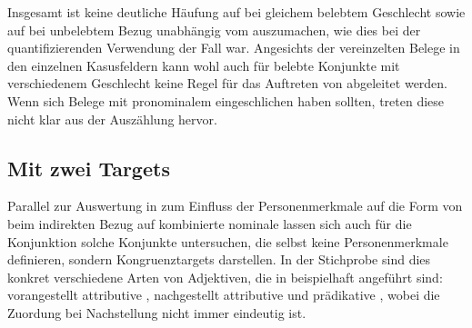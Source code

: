 Insgesamt ist keine deutliche Häufung auf  bei gleichem
belebtem Geschlecht sowie auf  bei
unbelebtem Bezug unabhängig vom  auszumachen, wie dies
bei der quantifizierenden Verwendung der Fall war. Angesichts der vereinzelten
Belege in den einzelnen Kasusfeldern kann wohl auch für belebte
Konjunkte mit verschiedenem Geschlecht keine Regel für das Auftreten von
 abgeleitet werden. Wenn sich Belege mit pronominalem 
eingeschlichen haben sollten, treten diese nicht klar aus der Auszählung
hervor.


\subsection{Mit zwei Targets}
\label{subsec:caobeidkoordtarg}

Parallel zur Auswertung in  zum Einfluss
der Personenmerkmale auf die Form von  beim indirekten Bezug auf
kombinierte nominale  lassen sich auch für die Konjunktion
 solche Konjunkte untersuchen, die selbst keine Personenmerkmale
definieren, sondern Kongruenz\-targets darstellen. In der Stichprobe sind dies
konkret verschiedene Arten von Adjektiven, die in 
beispielhaft angeführt sind: vorangestellt attributive
, nachgestellt attributive
 und prädikative
, wobei die Zuordung bei
Nachstellung nicht immer eindeutig ist.

